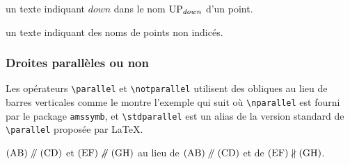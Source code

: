 \documentclass[12pt,a4paper]{article}
\begin{document}
 un texte indiquant $down$ dans le nom $\pt*{UP}{down}$ d'un point.


\bigskip



\IDarg{} un texte indiquant des noms de points non indicés.



	    \subsubsection{Droites parallèles ou non}
	    
Les opérateurs \verb+\parallel+ et \verb+\notparallel+ utilisent des obliques au lieu de barres verticales comme le montre l'exemple qui suit où \verb+\nparallel+ est fourni par le package \verb+amssymb+, et \verb+\stdparallel+ est un alias de la version standard de \verb+\parallel+ proposée par \LaTeX{}.

\begin{tcblisting}{}
$(\pts{AB}) \parallel (\pts{CD})$ et $(\pts{EF}) \notparallel (\pts{GH})$ au lieu de
$(\pts{AB}) \stdparallel (\pts{CD})$ et de $(\pts{EF}) \nparallel (\pts{GH})$.
\end{tcblisting}
\end{document}
